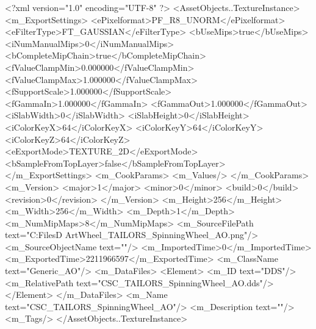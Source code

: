 <?xml version="1.0" encoding="UTF-8" ?>
<AssetObjects..TextureInstance>
	<m_ExportSettings>
		<ePixelformat>PF_R8_UNORM</ePixelformat>
		<eFilterType>FT_GAUSSIAN</eFilterType>
		<bUseMips>true</bUseMips>
		<iNumManualMips>0</iNumManualMips>
		<bCompleteMipChain>true</bCompleteMipChain>
		<fValueClampMin>0.000000</fValueClampMin>
		<fValueClampMax>1.000000</fValueClampMax>
		<fSupportScale>1.000000</fSupportScale>
		<fGammaIn>1.000000</fGammaIn>
		<fGammaOut>1.000000</fGammaOut>
		<iSlabWidth>0</iSlabWidth>
		<iSlabHeight>0</iSlabHeight>
		<iColorKeyX>64</iColorKeyX>
		<iColorKeyY>64</iColorKeyY>
		<iColorKeyZ>64</iColorKeyZ>
		<eExportMode>TEXTURE_2D</eExportMode>
		<bSampleFromTopLayer>false</bSampleFromTopLayer>
	</m_ExportSettings>
	<m_CookParams>
		<m_Values/>
	</m_CookParams>
	<m_Version>
		<major>1</major>
		<minor>0</minor>
		<build>0</build>
		<revision>0</revision>
	</m_Version>
	<m_Height>256</m_Height>
	<m_Width>256</m_Width>
	<m_Depth>1</m_Depth>
	<m_NumMipMaps>8</m_NumMipMaps>
	<m_SourceFilePath text="C:\Users\Shadow\Desktop\Working Files\3D Art\Props\Tailors\Spinning Wheel\CSC_TAILORS_SpinningWheel_AO.png"/>
	<m_SourceObjectName text=""/>
	<m_ImportedTime>0</m_ImportedTime>
	<m_ExportedTime>2211966597</m_ExportedTime>
	<m_ClassName text="Generic_AO"/>
	<m_DataFiles>
		<Element>
			<m_ID text="DDS"/>
			<m_RelativePath text="CSC_TAILORS_SpinningWheel_AO.dds"/>
		</Element>
	</m_DataFiles>
	<m_Name text="CSC_TAILORS_SpinningWheel_AO"/>
	<m_Description text=""/>
	<m_Tags/>
</AssetObjects..TextureInstance>

